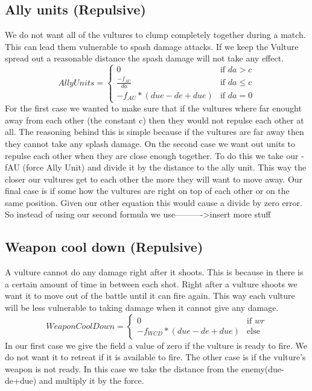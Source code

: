 	\subsection*{Ally units (Repulsive)}
We do not want all of the vultures to clump completely together during a match. This can lead them vulnerable to spash damage attacks. If we keep the Vulture spread out a reasonable distance the spash damage will not take any effect.
		\begin{displaymath}
			AllyUnits = \begin{cases}
					0 & \text{if } da > c\\
					\frac{-f_{AU}}{da} & \text{if } da \leq c\\
					-f_{AU} * (due - de + due) & \text{if } da = 0
				\end{cases}		
		\end{displaymath}
	For the first case we wanted to make sure that if the vultures where far enought away from each other (the constant c) then they would not repulse each other at all. The reasoning behind this is simple because if the vultures are far away then they cannot take any splash damage.
	On the second case we want out units to repulse each other when they are close enough together. To do this we take our -fAU (force Ally Unit) and divide it by the distance to the ally unit. This way the closer our vultures get to each other the more they will want to move away.
	Our final case is if some how the vultures are right on top of each other or on the same position. Given our other equation this would cause a divide by zero error. So instead of using our second formula we use---------->insert more stuff
	\subsection*{Weapon cool down (Repulsive)}
A vulture cannot do any damage right after it shoots. This is because in there is a certain amount of time in between each shot. Right after a vulture shoots we want it to move out of the battle until it can fire again. This way each vulture will be less vulnerable to taking damage when it cannot give any damage.
		\begin{displaymath}
			WeaponCoolDown = \begin{cases}
					0 & \text{if } wr\\
					-f_{WCD} * (due - de + due) & \text{else}
				\end{cases}		
		\end{displaymath}
In our first case we give the field a value of zero if the vulture is ready to fire. We do not want it to retreat if it is available to fire.
The other case is if the vulture's weapon is not ready. In this case we take the distance from the enemy(due-de+due) and multiply it by the force.
